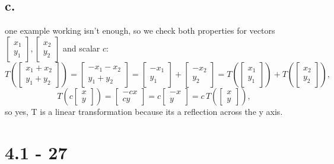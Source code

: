\documentclass{article}
\begin{document}
\subsection*{c.}

one example working isn't enough, so we check both properties for vectors
$\begin{bmatrix} x_1 \\ y_1 \end{bmatrix}, \begin{bmatrix} x_2 \\ y_2 \end{bmatrix}$
and scalar $c$:
\[
T\left(\begin{bmatrix} x_1 + x_2 \\ y_1 + y_2 \end{bmatrix}\right)
= \begin{bmatrix} -x_1 - x_2 \\ y_1 + y_2 \end{bmatrix}
= \begin{bmatrix} -x_1 \\ y_1 \end{bmatrix} + \begin{bmatrix} -x_2 \\ y_2 \end{bmatrix}
= T\left(\begin{bmatrix} x_1 \\ y_1 \end{bmatrix}\right) + T\left(\begin{bmatrix} x_2 \\ y_2 \end{bmatrix}\right),
\]
\[
T\left(c\begin{bmatrix} x \\ y \end{bmatrix}\right)
= \begin{bmatrix} -cx \\ cy \end{bmatrix}
= c\begin{bmatrix} -x \\ y \end{bmatrix}
= c\,T\left(\begin{bmatrix} x \\ y \end{bmatrix}\right),
\]
so yes, T is a linear transformation because its a reflection across the y axis.

\section*{4.1 - 27}
\end{document}
